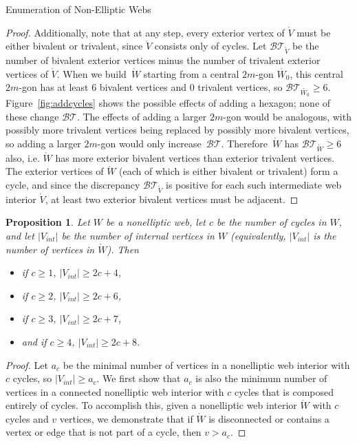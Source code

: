 \documentclass[11pt]{article}
\newtheorem{prop}[theo]{Proposition}
\theoremstyle{definition}
\numberwithin{equation}{section}
\numberwithin{equation}{section}
\begin{document}
\begin{subsection}{Enumeration of Non-Elliptic Webs}
\begin{proof}
Additionally, note that at any step, every exterior vertex of $\mathring{V}$ must be either bivalent or trivalent, since $\mathring{V}$ consists only of cycles. Let $\mathcal{BT}_{\mathring{V}}$ be the number of bivalent exterior vertices minus the number of trivalent exterior vertices of $\mathring{V}$. When we build~$\mathring{W}$ starting from a central $2m$-gon $\mathring{W_0}$, this central
$2m$-gon has at least 6 bivalent vertices and 0 trivalent vertices, so $\mathcal{BT}_{\mathring{W_0}}\geq 6$. Figure~\ref{fig:addcycles} shows the possible effects of adding a hexagon; none of these change $\mathcal{BT}$. The effects of adding a larger $2m$-gon would be analogous, with possibly more trivalent vertices being replaced by possibly more bivalent vertices, so adding a larger $2m$-gon would only increase~$\mathcal{BT}$. Therefore~$\mathring{W}$ has $\mathcal{BT}_{\mathring{W}}\geq 6$ also, i.e. $\mathring{W}$ has more exterior bivalent vertices than exterior trivalent vertices. The exterior vertices of $\mathring{W}$ (each of which is either bivalent or trivalent) form a cycle, and since the discrepancy $\mathcal{BT}_{\mathring{V}}$ is positive for each such intermediate web interior $\mathring{V}$, at least two exterior bivalent vertices must be adjacent.
\end{proof}

\begin{prop}\label{prop:minvertices}
Let $W$ be a nonelliptic web, let $c$ be the number of cycles in $W$, and let $|V_{int}|$ be the number of internal vertices in $W$ (equivalently, $|V_{int}|$ is the number of vertices in $\mathring{W}$). Then
\begin{itemize}
    \item if $c \geq 1$, $|V_{int}| \geq 2c+4$,
    \item if $c \geq 2$, $|V_{int}| \geq 2c+6$,
    \item if $c \geq 3$, $|V_{int}| \geq 2c+7$,
    \item and if $c \geq 4$, $|V_{int}| \geq 2c + 8$. 
\end{itemize}
\end{prop}
\begin{proof}
Let $a_c$ be the minimal number of vertices in a nonelliptic web interior with $c$ cycles, so $|V_{int}| \geq a_c$. We first show that $a_c$ is also the minimum number of vertices in a connected nonelliptic web interior with $c$ cycles that is composed entirely of cycles. To accomplish this, given a nonelliptic web interior $\mathring{W}$ with $c$ cycles and $v$ vertices, we demonstrate that if $\mathring{W}$ is disconnected or contains a vertex or edge that is not part of a cycle, then $v>a_c$.


\end{proof}
\end{subsection}
\end{document}
